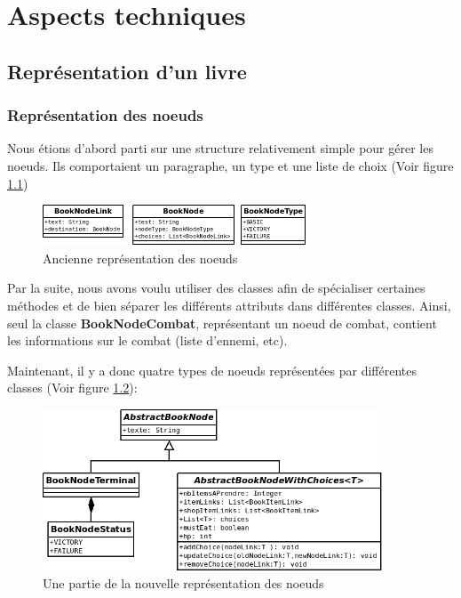 \chapter{Aspects techniques}

	\section{Représentation d'un livre}

		\subsection{Représentation des noeuds}

			Nous étions d'abord parti sur une structure relativement simple pour gérer les noeuds. Ils comportaient un paragraphe, un type et une liste de choix (Voir figure \ref{fig:OldBookNode})

			\begin{figure}[H]
				\centering\includegraphics[width=0.70\textwidth, keepaspectratio]{img/BookNodeBefore.png}
				\caption{Ancienne représentation des noeuds}
				\label{fig:OldBookNode}
			\end{figure}

			 Par la suite, nous avons voulu utiliser des classes afin de spécialiser certaines méthodes et de bien séparer les différents attributs dans différentes classes. Ainsi, seul la classe \textbf{BookNodeCombat}, représentant un noeud de combat, contient les informations sur le combat (liste d'ennemi, etc).

			Maintenant, il y a donc quatre types de noeuds représentées par différentes classes (Voir figure \ref{fig:BookNode}):

			\begin{figure}[H]
				\centering\includegraphics[width=0.90\textwidth, keepaspectratio]{img/BookNode1.png}
				\caption{Une partie de la nouvelle représentation des noeuds}
				\label{fig:BookNode}
			\end{figure}

